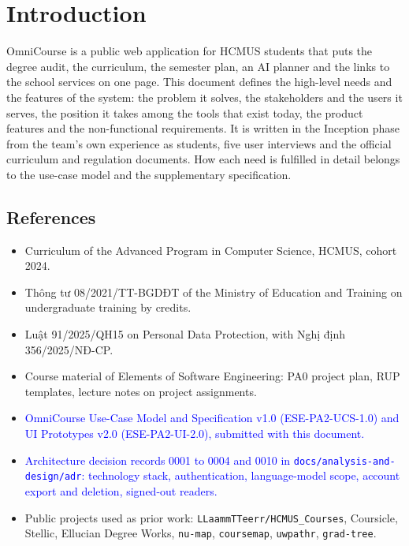 \documentclass{article}
\begin{document}
{\hypersetup{linkcolor=ocNavy}\tableofcontents}

\clearpage
{}

\section{Introduction}
OmniCourse is a public web application for HCMUS students that puts the degree audit, the curriculum, the semester plan, an
AI planner and the links to the school services on one page. This document defines the high-level needs and the features of
the system: the problem it solves, the stakeholders and the users it serves, the position it takes among the tools that
exist today, the product features and the non-functional requirements. It is written in the Inception phase from the
team's own experience as students, five user interviews and the official curriculum and regulation documents. How each need
is fulfilled in detail belongs to the use-case model and the supplementary specification.

\subsection{References}
\begin{itemize}
  \item Curriculum of the Advanced Program in Computer Science, HCMUS, cohort 2024.
  \item Thông tư 08/2021/TT-BGDĐT of the Ministry of Education and Training on undergraduate training by credits.
  \item Luật 91/2025/QH15 on Personal Data Protection, with Nghị định 356/2025/NĐ-CP.
  \item Course material of Elements of Software Engineering: PA0 project plan, RUP templates, lecture notes on project
        assignments.
  \item \textcolor{blue}{OmniCourse Use-Case Model and Specification v1.0 (ESE-PA2-UCS-1.0) and UI Prototypes v2.0
        (ESE-PA2-UI-2.0), submitted with this document.}
  \item \textcolor{blue}{Architecture decision records 0001 to 0004 and 0010 in \texttt{docs/analysis-and-design/adr}:
        technology stack, authentication, language-model scope, account export and deletion, signed-out readers.}
  \item Public projects used as prior work: \texttt{LLaammTTeerr/HCMUS\_Courses}, Coursicle, Stellic, Ellucian Degree
        Works, \texttt{nu-map}, \texttt{coursemap}, \texttt{uwpathr}, \texttt{grad-tree}.
\end{itemize}
\end{document}
